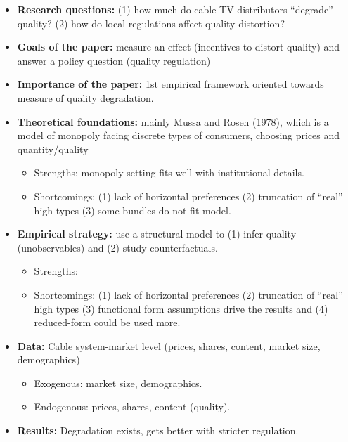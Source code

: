 \begin{itemize}
\item \textbf{Research questions:} (1) how much do cable TV distributors ``degrade'' quality? (2) how do local regulations affect quality distortion?
\item \textbf{Goals of the paper:} measure an effect (incentives to distort quality) and answer a policy question (quality regulation)
\item \textbf{Importance of the paper:} 1st empirical framework oriented towards measure of quality degradation.
\item \textbf{Theoretical foundations:} mainly Mussa and Rosen (1978), which is a model of monopoly facing discrete types of consumers, choosing prices and quantity/quality \begin{itemize}
\item Strengths: monopoly setting fits well with institutional details.
\item Shortcomings: (1) lack of horizontal preferences (2) truncation of ``real'' high types (3) some bundles do not fit model.
\end{itemize}
\item \textbf{Empirical strategy:} use a structural model to (1) infer quality (unobservables) and (2) study counterfactuals.\begin{itemize}
\item Strengths: 
\item Shortcomings: (1) lack of horizontal preferences (2) truncation of ``real'' high types (3) functional form assumptions drive the results and (4) reduced-form could be used more.
\end{itemize}
\item \textbf{Data:} Cable system-market level (prices, shares, content, market size, demographics)
\begin{itemize}
\item Exogenous: market size, demographics.
\item Endogenous: prices, shares, content (quality).
\end{itemize}
\item \textbf{Results:} Degradation exists, gets better with stricter regulation.
\end{itemize}


